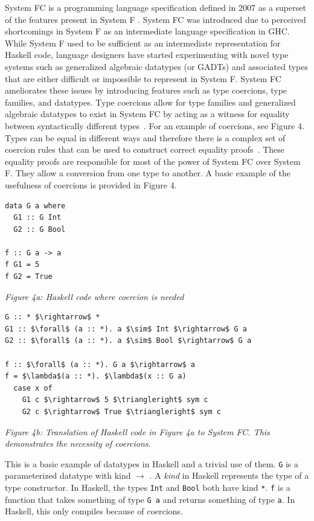\documentclass{sig-alternate}
\begin{document}
System FC is a programming language specification defined in 2007 as a superset of the features present in System F \cite{conf/tldi/SulzmannCJD07}. System FC was introduced due to perceived shortcomings in System F as an intermediate language specification in GHC. While System F used to be sufficient as an intermediate representation for Haskell code, language designers have started experimenting with novel type systems such as generalized algebraic datatypes (or GADTs) and associated types that are either difficult or impossible to represent in System F. System FC ameliorates these issues by introducing features such as type coercions, type families, and datatypes. 
Type coercions allow for type families and generalized algebraic datatypes to exist in System FC by acting as a witness for equality between syntactically different types~\cite{DBLP:conf/rta/VytiniotisJ13}. For an example of coercions, see Figure 4. Types can be equal in different ways and therefore there is a complex set of coercion rules that can be used to construct correct equality proofs~\cite{Breitner:2014:SZC:2628136.2628141}. These equality proofs are responsible for most of the power of System FC over System F. They allow a conversion from one type to another. A basic example of the usefulness of coercions is provided in Figure 4.
\begin{verbatim}
data G a where
  G1 :: G Int
  G2 :: G Bool

f :: G a -> a
f G1 = 5
f G2 = True
\end{verbatim}
\begin{center}
\it Figure 4a: Haskell code where coercion is needed
\end{center}


\begin{lstlisting}
G :: * $\rightarrow$ *
G1 :: $\forall$ (a :: *). a $\sim$ Int $\rightarrow$ G a
G2 :: $\forall$ (a :: *). a $\sim$ Bool $\rightarrow$ G a

f :: $\forall$ (a :: *). G a $\rightarrow$ a
f = $\lambda$(a :: *). $\lambda$(x :: G a)
  case x of
    G1 c $\rightarrow$ 5 $\triangleright$ sym c
    G2 c $\rightarrow$ True $\triangleright$ sym c
\end{lstlisting}
\begin{center}
\it Figure 4b: Translation of Haskell code in Figure 4a to System FC. This demonstrates the necessity of coercions.
\end{center}

This is a basic example of datatypes in Haskell and a trivial use of them. \texttt{G} is a parameterized datatype with kind {\tt *} $\rightarrow$ {\tt *}. A \textit{kind} in Haskell represents the type of a type constructor. In Haskell, the types \texttt{Int} and \texttt{Bool} both have kind \texttt{*}. \texttt{f} is a function that takes something of type \texttt{G a} and returns something of type \texttt{a}. In Haskell, this only compiles because of coercions.
\end{document}
